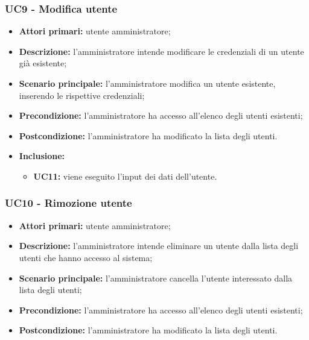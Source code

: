 \subsubsection{UC9 - Modifica utente}
	\begin{itemize}
		\item \textbf{Attori primari:} utente amministratore;
		\item \textbf{Descrizione:} l'amministratore intende modificare le credenziali di un utente già esistente;
		\item \textbf{Scenario principale:} l'amministratore modifica un utente esistente, inserendo le rispettive credenziali;
		\item \textbf{Precondizione:} l'amministratore ha accesso all'elenco degli utenti esistenti;
		\item \textbf{Postcondizione:} l'amministratore ha modificato la lista degli utenti.
		\item \textbf{Inclusione:} 
		\begin{itemize}
			\item \textbf{UC11:} viene eseguito l'input dei dati dell'utente.
		\end{itemize}
	\end{itemize}

\subsubsection{UC10 - Rimozione utente}
	\begin{itemize}
		\item \textbf{Attori primari:} utente amministratore;
		\item \textbf{Descrizione:} l'amministratore intende eliminare un utente dalla lista degli utenti che hanno accesso al sistema;
		\item \textbf{Scenario principale:} l'amministratore cancella l'utente interessato dalla lista degli utenti;
		\item \textbf{Precondizione:} l'amministratore ha accesso all'elenco degli utenti esistenti;
		\item \textbf{Postcondizione:} l'amministratore ha modificato la lista degli utenti.
	\end{itemize}

